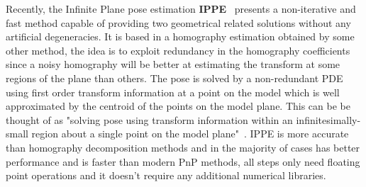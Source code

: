 \documentclass[letterpaper, 10 pt, conference]{ieeeconf}  %
\begin{document}
	Recently, the Infinite Plane pose estimation \textbf{IPPE}~\cite{Collins2014} presents a non-iterative and fast method capable of providing two geometrical related solutions without any artificial degeneracies. It is based in a homography estimation obtained by some other method, the idea is to exploit redundancy in the homography coefficients since a noisy homography will be better at estimating the transform at some regions of the plane than others. The pose is solved by a non-redundant PDE using first order transform information at a point on the model which is well approximated by the centroid of the points on the model plane. This can be be thought of as "solving pose using transform information within an infinitesimally-small region about a single point on the model plane"~\cite{Collins2014}. IPPE is more accurate than homography decomposition methods and in the  majority of cases has better performance and is faster than modern PnP methods, all steps only need floating point operations and it doesn't require any additional numerical libraries.
	
	
	
	
\end{document}
